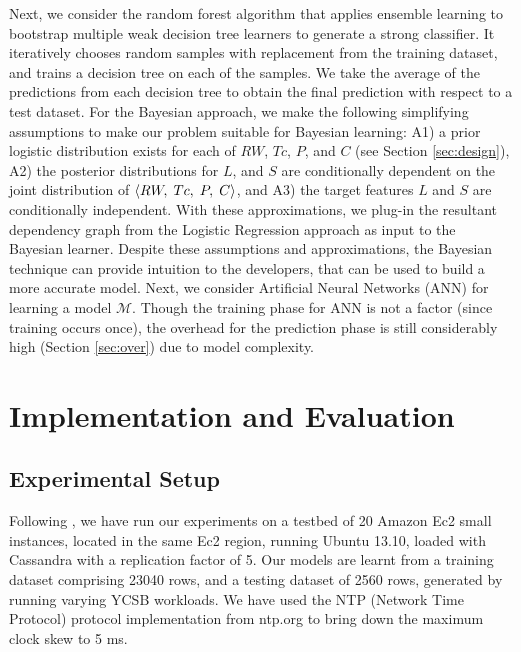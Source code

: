 \documentclass[conference]{IEEEtran}
\begin{document}
 Next, we consider the random forest algorithm that applies ensemble learning to bootstrap multiple weak decision tree learners to generate a strong classifier. It iteratively chooses random samples with replacement from the training dataset, and trains a decision tree on each of the samples. We take the average of the predictions from each decision tree to obtain the final prediction with respect to a test dataset.
  For the Bayesian approach, we make the following simplifying assumptions to make our problem suitable for Bayesian learning: A1) a prior logistic distribution exists for each of $RW$, $Tc$, $P$, and $C$ (see Section \ref{sec:design}), A2) the
 posterior distributions for
    $L$, and $S$ are conditionally dependent on the joint distribution of $\langle RW,\; Tc,\; P,\; C\rangle$, and A3) the target features $L$ and $S$ are conditionally independent.
     With these approximations, we plug-in the resultant dependency graph from the Logistic Regression approach as input to the Bayesian learner. Despite these assumptions and approximations, the Bayesian technique can provide intuition to the developers, that can be used to build a more accurate model. Next, we consider Artificial Neural Networks (ANN) for learning a model $\mathcal{M}$. Though the training phase for ANN is not a factor (since training occurs once), the overhead for the prediction phase is still considerably high (Section \ref{sec:over}) due to model complexity.

\section{Implementation and Evaluation}\label{sec:eval}

\subsection{Experimental Setup}\label{sec:setup}
Following \cite{DBLP:conf/cloud/GolabRAKWG13}, we have run our experiments on a testbed of 20 Amazon Ec2 small
instances, located in the same Ec2 region, running Ubuntu 13.10, loaded with Cassandra with a replication factor of 5.  Our models are learnt from a training dataset comprising 23040 rows, and a testing dataset of 2560 rows, generated by running varying YCSB \cite{Cooper:2010:BCS:1807128.1807152} workloads.
We have used the NTP (Network Time Protocol) protocol implementation from ntp.org to bring down the maximum clock skew to 5 ms. 
\end{document}

